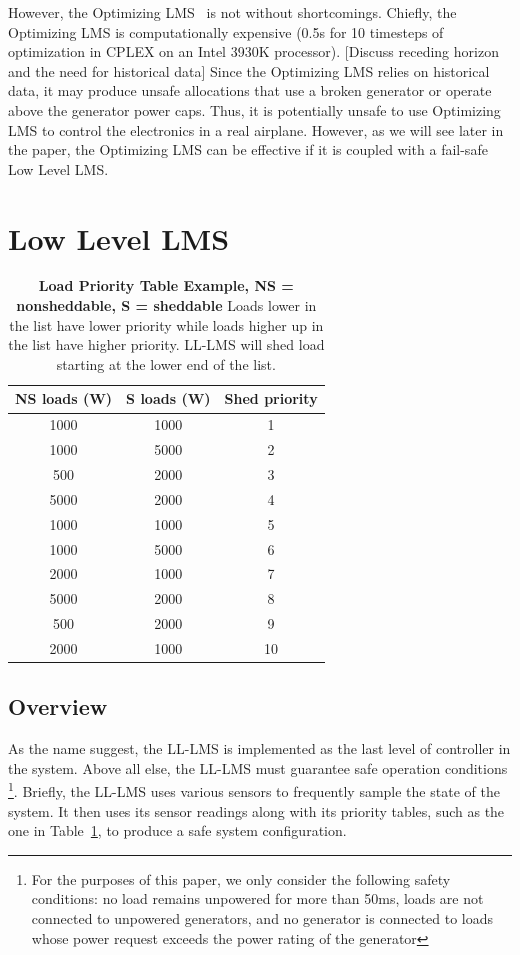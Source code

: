 \documentclass{acm_proc_article-sp}
\begin{document}
However, the Optimizing LMS~\cite{mehdi} is not without shortcomings.
Chiefly, the Optimizing LMS is computationally expensive (0.5s for 10 timesteps of optimization in CPLEX on an Intel 3930K processor).
[Discuss receding horizon and the need for historical data]
Since the Optimizing LMS relies on historical data, it may produce unsafe allocations that use a broken generator or operate above the generator power caps.
Thus, it is potentially unsafe to use Optimizing LMS to control the electronics in a real airplane. 
However, as we will see later in the paper, the Optimizing LMS can be effective if it is coupled with a fail-safe Low Level LMS.

\section{Low Level LMS}
\begin{table}[t]
\caption{\textbf{Load Priority Table Example, NS = nonsheddable, S = sheddable} 
Loads lower in the list have lower priority while loads higher up in the list have
higher priority. LL-LMS will shed load starting at the lower end of the list.}
\label{T:shed}
\centering
\begin{tabular}{c|cc}
 NS loads (W) & S loads (W) & Shed priority \\ \hline
1000 & 1000 & 1 \\
1000 & 5000 & 2 \\
500 & 2000 & 3 \\
5000 & 2000 & 4 \\
1000 & 1000 & 5 \\
1000 & 5000 & 6 \\
2000 & 1000 & 7 \\
5000 & 2000 & 8 \\
500 & 2000 & 9 \\
2000 & 1000 & 10 \\ \hline
\end{tabular}
\end{table}

\subsection{Overview}
As the name suggest, the LL-LMS is implemented as the last level of controller in the system. Above all else, the LL-LMS must guarantee safe operation
conditions \footnote{For the purposes of this paper, we only consider the following safety conditions: no load remains unpowered for more than 50ms,
loads are not connected to unpowered generators, and no generator is connected to loads whose power request exceeds the power rating of the generator}.
Briefly, the LL-LMS uses various sensors to frequently sample the state of the system. It then uses its sensor readings along with its
priority tables, such as the one in Table~\ref{T:shed}, to produce a safe system configuration.
\end{document}
